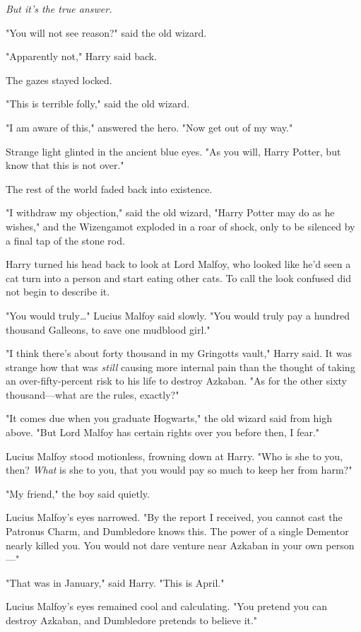 \emph{But it's the true answer.}

"You will not see reason?" said the old wizard.

"Apparently not," Harry said back.

The gazes stayed locked.

"This is terrible folly," said the old wizard.

"I am aware of this," answered the hero. "Now get out of my way."

Strange light glinted in the ancient blue eyes. "As you will, Harry Potter, but 
know that this is not over."

The rest of the world faded back into existence.

"I withdraw my objection," said the old wizard, "Harry Potter may do as he 
wishes," and the Wizengamot exploded in a roar of shock, only to be silenced by 
a final tap of the stone rod.

Harry turned his head back to look at Lord Malfoy, who looked like he'd seen a 
cat turn into a person and start eating other cats. To call the look confused 
did not begin to describe it.

"You would truly{\ldots}" Lucius Malfoy said slowly. "You would truly pay a 
hundred thousand Galleons, to save one mudblood girl."

"I think there's about forty thousand in my Gringotts vault," Harry said. It 
was strange how that was \emph{still} causing more internal pain than the 
thought of taking an over-fifty-percent risk to his life to destroy Azkaban. 
"As for the other sixty thousand---what are the rules, exactly?"

"It comes due when you graduate Hogwarts," the old wizard said from high above. 
"But Lord Malfoy has certain rights over you before then, I fear."

Lucius Malfoy stood motionless, frowning down at Harry. "Who is she to you, 
then? \emph{What} is she to you, that you would pay so much to keep her from 
harm?"

"My friend," the boy said quietly.

Lucius Malfoy's eyes narrowed. "By the report I received, you cannot cast the 
Patronus Charm, and Dumbledore knows this. The power of a single Dementor 
nearly killed you. You would not dare venture near Azkaban in your own 
person---"

"That was in January," said Harry. "This is April."

Lucius Malfoy's eyes remained cool and calculating. "You pretend you can 
destroy Azkaban, and Dumbledore pretends to believe it."

